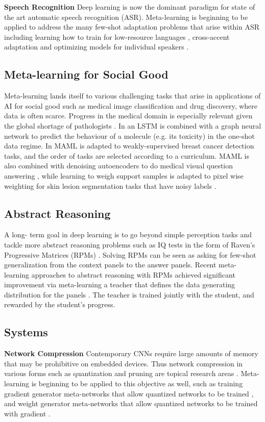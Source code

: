 \documentclass[10pt,journal,compsoc]{IEEEtran}
\newcommand{\keypoint}[1]{\vspace{0.1cm}\noindent\textbf{#1}\quad}
\begin{document}
\keypoint{Speech Recognition} Deep learning is now the dominant paradigm for state of the art automatic speech recognition (ASR). Meta-learning is beginning to be applied to address the many few-shot adaptation problems that arise within ASR including learning how to train for low-resource languages \cite{hsu2019metaasr}, cross-accent adaptation \cite{winata2020learning} and optimizing models for individual speakers \cite{klejch2018learning}.

\subsection{Meta-learning for Social Good}
Meta-learning lands itself to various challenging tasks that arise in applications of AI for social good such as medical image classification and drug discovery, where data is often scarce. Progress in the medical domain is especially relevant given the global shortage of pathologists \cite{metter2019pathologistshortage}. In \cite{altae2016oneshotdrugdiscovery} an LSTM is combined with a graph neural network to predict the behaviour of a molecule (e.g. its toxicity) in the one-shot data regime. In \cite{maicas2018maml4radiology} MAML is adapted to weakly-supervised breast cancer detection tasks, and the order of tasks are selected according to a curriculum. MAML is also combined with denoising autoencoders to do medical visual question answering \cite{nguyen2019medicalvqa}, while learning to weigh support samples \cite{ren2018meta} is adapted to pixel wise weighting for skin lesion segmentation tasks that have noisy labels \cite{mirikharaji2019noisyskinlesion}.

\subsection{Abstract Reasoning}
A long- term goal in deep learning is to go beyond simple perception tasks and tackle more abstract reasoning problems such as IQ tests in the form of Raven's Progressive Matrices (RPMs) \cite{barrett2018abstractreasoningiqtest}. Solving RPMs can be seen as asking for few-shot generalization from the context panels to the answer panels. Recent meta-learning approaches to abstract reasoning with RPMs achieved significant improvement via meta-learning a teacher that defines the data generating distribution for the panels \cite{zheng2019abstractreason}. The teacher is trained jointly with the student, and rewarded by the student's progress.
 

\subsection{Systems}
\keypoint{Network Compression}
Contemporary CNNs require large amounts of memory that may be prohibitive on embedded devices. Thus network compression in various forms such as quantization and pruning are topical research areas \cite{dai2018compressing}. Meta-learning is beginning to be applied to this objective as well, such as training gradient generator meta-networks that allow quantized networks to be trained \cite{chen2019metaquant}, and weight generator meta-networks that allow quantized networks to be trained with gradient \cite{liu2019metapruning}.
\end{document}
